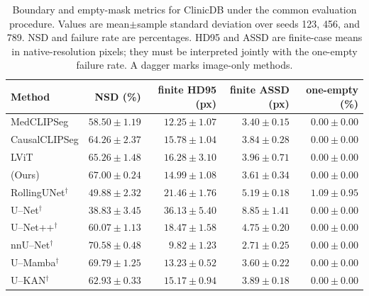 \begin{table}[htbp]
\centering
\caption{Boundary and empty-mask metrics for ClinicDB under the common evaluation procedure. Values are mean$\pm$sample standard deviation over seeds 123, 456, and 789. NSD and failure rate are percentages. HD95 and ASSD are finite-case means in native-resolution pixels; they must be interpreted jointly with the one-empty failure rate. A dagger marks image-only methods.}
\label{tab:supp_boundary_medclipseg_clinicdb}
\footnotesize
\setlength{\tabcolsep}{4.0pt}
\begin{tabular}{@{}lrrrr@{}}
\toprule
Method & NSD (\%) & finite HD95 (px) & finite ASSD (px) & one-empty (\%) \\
\midrule
MedCLIPSeg & $58.50\pm1.19$ & $12.25\pm1.07$ & $3.40\pm0.15$ & $0.00\pm0.00$ \\
CausalCLIPSeg & $64.26\pm2.37$ & $15.78\pm1.04$ & $3.84\pm0.28$ & $0.00\pm0.00$ \\
LViT & $65.26\pm1.48$ & $16.28\pm3.10$ & $3.96\pm0.71$ & $0.00\pm0.00$ \\
\methodname{} (Ours) & $67.00\pm0.24$ & $14.99\pm1.08$ & $3.61\pm0.34$ & $0.00\pm0.00$ \\
RollingUNet$^\dagger$ & $49.88\pm2.32$ & $21.46\pm1.76$ & $5.19\pm0.18$ & $1.09\pm0.95$ \\
U--Net$^\dagger$ & $38.83\pm3.45$ & $36.13\pm5.40$ & $8.85\pm1.41$ & $0.00\pm0.00$ \\
U--Net++$^\dagger$ & $60.07\pm1.13$ & $18.47\pm1.58$ & $4.75\pm0.20$ & $0.00\pm0.00$ \\
nnU--Net$^\dagger$ & $70.58\pm0.48$ & $9.82\pm1.23$ & $2.71\pm0.25$ & $0.00\pm0.00$ \\
U--Mamba$^\dagger$ & $69.79\pm1.25$ & $13.23\pm0.52$ & $3.60\pm0.22$ & $0.00\pm0.00$ \\
U--KAN$^\dagger$ & $62.93\pm0.33$ & $15.17\pm0.94$ & $3.89\pm0.18$ & $0.00\pm0.00$ \\
\bottomrule
\end{tabular}
\end{table}

